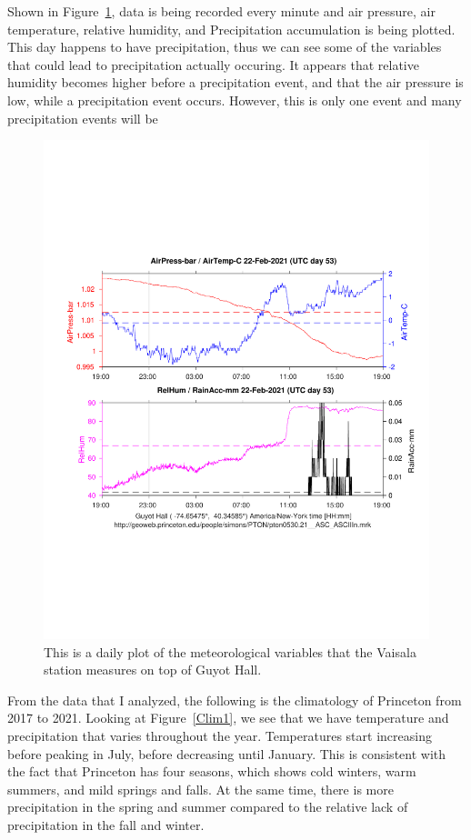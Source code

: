 \documentclass[11pt]{report}
\begin{document}
Shown in Figure~\ref{daily}, data is being recorded every minute and air pressure, air temperature, relative humidity, and Precipitation accumulation is being plotted. This day happens to have precipitation, thus we can see some of the variables that could lead to precipitation actually occuring. It appears that relative humidity becomes higher before a precipitation event, and that the air pressure is low, while a precipitation event occurs. However, this is only one event and many precipitation events will be 
\begin{figure}
	\centering 
	\includegraphics[trim = 0.5cm 5.0cm 0.5cm 6.0cm, clip, width = 1.0\textwidth]{Figures/guyotweather_ywt_feb_22_2021.pdf}
	\caption[Weather Station Data]{\label{daily} This is a daily plot of the meteorological variables that the Vaisala station measures on top of Guyot Hall. }
\end{figure}

From the data that I analyzed, the following is the climatology of Princeton from 2017 to 2021. Looking at Figure~\ref{Clim1}, we see that we have temperature and precipitation that varies throughout the year. Temperatures start increasing before peaking in July, before decreasing until January. This is consistent with the fact that Princeton has four seasons, which shows cold winters, warm summers, and mild springs and falls. At the same time, there is more precipitation in the spring and summer compared to the relative lack of precipitation in the fall and winter.
\end{document}
